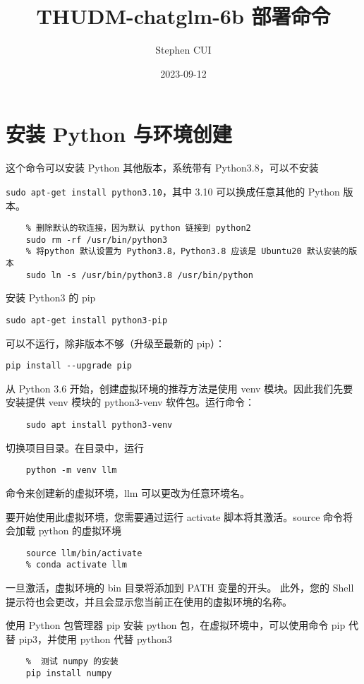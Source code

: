 \documentclass{article}
\title{THUDM-chatglm-6b 部署命令}
\author{Stephen CUI}
\date{2023-09-12}
\begin{document}
\maketitle


\section{安装 Python 与环境创建}
这个命令可以安装 Python 其他版本，系统带有 Python3.8，可以不安装

\verb|sudo apt-get install python3.10|，其中 3.10 可以换成任意其他的 Python 版本。

\begin{verbatim}
    % 删除默认的软连接，因为默认 python 链接到 python2
    sudo rm -rf /usr/bin/python3
    % 将python 默认设置为 Python3.8，Python3.8 应该是 Ubuntu20 默认安装的版本
    sudo ln -s /usr/bin/python3.8 /usr/bin/python
\end{verbatim}

安装 Python3 的 pip

\verb|sudo apt-get install python3-pip|

可以不运行，除非版本不够（升级至最新的 pip）：

\verb|pip install --upgrade pip|

从 Python 3.6 开始，创建虚拟环境的推荐方法是使用 venv 模块。因此我们先要安装提供 venv 模块的 python3-venv 软件包。运行命令：
\begin{verbatim}
    sudo apt install python3-venv
\end{verbatim}

切换项目目录。在目录中，运行
\begin{verbatim}
    python -m venv llm
\end{verbatim}
命令来创建新的虚拟环境，llm 可以更改为任意环境名。

要开始使用此虚拟环境，您需要通过运行 activate 脚本将其激活。source 命令将会加载 python 的虚拟环境
\begin{verbatim}
    source llm/bin/activate
    % conda activate llm
\end{verbatim}

一旦激活，虚拟环境的 bin 目录将添加到 PATH 变量的开头。 此外，您的 Shell 提示符也会更改，并且会显示您当前正在使用的虚拟环境的名称。

使用 Python 包管理器 pip 安装 python 包，在虚拟环境中，可以使用命令 pip 代替 pip3，并使用 python 代替 python3
\begin{verbatim}
    %  测试 numpy 的安装
    pip install numpy  
\end{verbatim}
\end{document}
